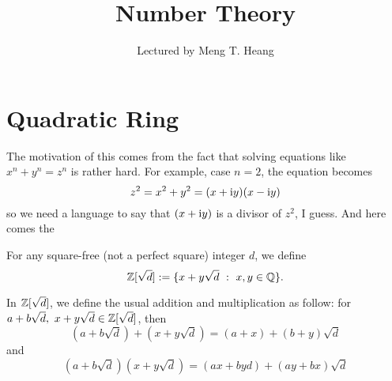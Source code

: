 



\title{Number Theory}
\author{Lectured by Meng T. Heang}

\maketitle


\chapter{Quadratic Ring}

The motivation of this comes from the fact that solving 
equations like $x^n+y^n=z^n$ is rather hard. For example, 
case $n=2$, the equation becomes
\[z^2=x^2+y^2=(x+\mathrm i y)(x-\mathrm i y)\]
so we need a language to say that $(x+\mathrm i y)$ is a divisor 
of $z^2$, I guess. And here comes the 

\begin{definition}
  For any square-free (not a perfect square) integer $d$,
  we define
  \[\Z[\sqrt{d}]:=\{x+y\sqrt{d}~:~ x,y\in\Q\}.\]
\end{definition}
In $\Z[\sqrt d]$, we define the usual addition and multiplication
as follow: for $a+b\sqrt d,~x+y\sqrt d\in\Z[\sqrt d]$, then
\[ (a+b\sqrt d)+(x+y\sqrt d)=(a+x)+(b+y)\sqrt d \]
and
\[ (a+b\sqrt d)(x+y\sqrt d)=(ax+byd)+(ay+bx)\sqrt d \]











